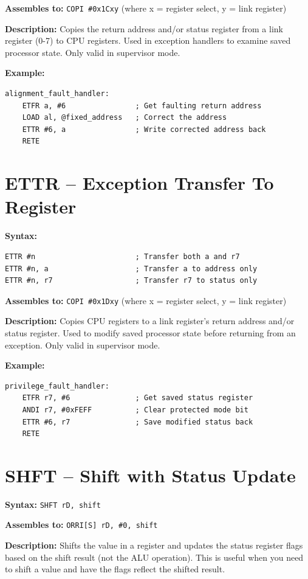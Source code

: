 \textbf{Assembles to:} \texttt{COPI \#0x1Cxy} (where x = register select, y = link register)

\textbf{Description:} Copies the return address and/or status register from a link register (0-7) to CPU registers. Used in exception handlers to examine saved processor state. Only valid in supervisor mode.

\textbf{Example:}
\begin{lstlisting}
alignment_fault_handler:
    ETFR a, #6                ; Get faulting return address
    LOAD al, @fixed_address   ; Correct the address
    ETTR #6, a                ; Write corrected address back
    RETE
\end{lstlisting}

\section{ETTR -- Exception Transfer To Register}

\textbf{Syntax:}
\begin{lstlisting}
ETTR #n                       ; Transfer both a and r7
ETTR #n, a                    ; Transfer a to address only
ETTR #n, r7                   ; Transfer r7 to status only
\end{lstlisting}

\textbf{Assembles to:} \texttt{COPI \#0x1Dxy} (where x = register select, y = link register)

\textbf{Description:} Copies CPU registers to a link register's return address and/or status register. Used to modify saved processor state before returning from an exception. Only valid in supervisor mode.

\textbf{Example:}
\begin{lstlisting}
privilege_fault_handler:
    ETFR r7, #6               ; Get saved status register
    ANDI r7, #0xFEFF          ; Clear protected mode bit
    ETTR #6, r7               ; Save modified status back
    RETE
\end{lstlisting}

\section{SHFT -- Shift with Status Update}

\textbf{Syntax:} \texttt{SHFT rD, shift}

\textbf{Assembles to:} \texttt{ORRI[S] rD, \#0, shift}

\textbf{Description:} Shifts the value in a register and updates the status register flags based on the shift result (not the ALU operation). This is useful when you need to shift a value and have the flags reflect the shifted result.

